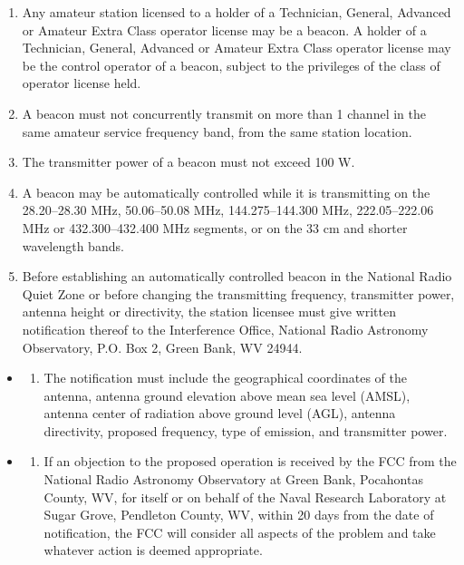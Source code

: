 \documentclass[
  letterpaper,
  DIV=11,
  numbers=noendperiod]{scrreport}
\providecommand{\tightlist}{%
  \setlength{\itemsep}{0pt}\setlength{\parskip}{0pt}}\usepackage{longtable,booktabs,array}
\begin{document}
\begin{enumerate}
\def\labelenumi{(\alph{enumi})}
\item
  Any amateur station licensed to a holder of a Technician, General,
  Advanced or Amateur Extra Class operator license may be a beacon. A
  holder of a Technician, General, Advanced or Amateur Extra Class
  operator license may be the control operator of a beacon, subject to
  the privileges of the class of operator license held.
\item
  A beacon must not concurrently transmit on more than 1 channel in the
  same amateur service frequency band, from the same station location.
\item
  The transmitter power of a beacon must not exceed 100 W.
\item
  A beacon may be automatically controlled while it is transmitting on
  the 28.20--28.30 MHz, 50.06--50.08 MHz, 144.275--144.300 MHz,
  222.05--222.06 MHz or 432.300--432.400 MHz segments, or on the 33 cm
  and shorter wavelength bands.
\item
  Before establishing an automatically controlled beacon in the National
  Radio Quiet Zone or before changing the transmitting frequency,
  transmitter power, antenna height or directivity, the station licensee
  must give written notification thereof to the Interference Office,
  National Radio Astronomy Observatory, P.O. Box 2, Green Bank, WV
  24944.
\end{enumerate}

\begin{itemize}
\item
  \begin{enumerate}
  \def\labelenumi{(\arabic{enumi})}
  \tightlist
  \item
    The notification must include the geographical coordinates of the
    antenna, antenna ground elevation above mean sea level (AMSL),
    antenna center of radiation above ground level (AGL), antenna
    directivity, proposed frequency, type of emission, and transmitter
    power.
  \end{enumerate}
\item
  \begin{enumerate}
  \def\labelenumi{(\arabic{enumi})}
  \setcounter{enumi}{1}
  \tightlist
  \item
    If an objection to the proposed operation is received by the FCC
    from the National Radio Astronomy Observatory at Green Bank,
    Pocahontas County, WV, for itself or on behalf of the Naval Research
    Laboratory at Sugar Grove, Pendleton County, WV, within 20 days from
    the date of notification, the FCC will consider all aspects of the
    problem and take whatever action is deemed appropriate.
  \end{enumerate}
\end{itemize}
\end{document}
